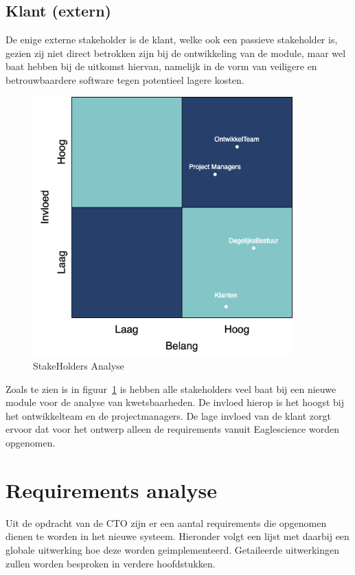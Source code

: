 \subsection{Klant (extern)}\label{subsec:klant-(extern)1}
De enige externe stakeholder is de klant, welke ook een passieve stakeholder is, gezien zij niet direct betrokken zijn bij de ontwikkeling van de module, maar wel baat hebben bij de uitkomst hiervan, namelijk in de vorm van veiligere en betrouwbaardere software tegen potentieel lagere kosten.

\begin{figure}
    \myfloatalign
    \includegraphics[width=10cm]{gfx/stakeholderanalyse}
    \caption{StakeHolders Analyse}
    \label{fig:StakeholderAnalyse1}
\end{figure}
Zoals te zien is in figuur~\ref{fig:StakeholderAnalyse1} is hebben alle stakeholders veel baat bij een nieuwe module voor de analyse van kwetsbaarheden. De invloed hierop is het hoogst bij het ontwikkelteam en de projectmanagers. De lage invloed van de klant zorgt ervoor dat voor het ontwerp alleen de requirements vanuit Eaglescience worden opgenomen.


\section{Requirements analyse}\label{sec:requirementsAnalyse}
Uit de opdracht van de CTO zijn er een aantal requirements die opgenomen dienen te worden in het nieuwe systeem. Hieronder volgt een lijst met daarbij een globale uitwerking hoe deze worden geimplementeerd. Getaileerde uitwerkingen zullen worden besproken in verdere hoofdstukken.

